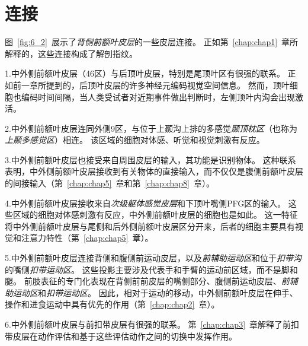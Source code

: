 \section{连接}

图~\ref{fig:6_2}~展示了\textit{背侧前额叶皮层}的一些皮层连接。
正如第~\ref{chap:chap1}~章所解释的，这些连接构成了解剖指纹。
\par


1.中外侧前额叶皮层（46区）与后顶叶皮层，特别是尾顶叶区有很强的联系\cite{petrides1984projections}。
正如前一章所提到的，后顶叶皮层的许多神经元编码视觉空间信息。
然而，顶叶细胞也编码时间间隔\cite{leon2003representation}，当人类受试者对近期事件做出判断时，左侧顶叶内沟会出现激活\cite{dudukovic2007goal}。
\par


2.中外侧前额叶皮层连同外侧9区，与位于上颞沟上排的多感觉\textit{颞顶枕区}（也称为\textit{上颞多感觉区}）相连\cite{seltzer1996overlapping}。
该区域的细胞对体感、听觉和视觉刺激有反应\cite{bruce1981visual}。
\par


3.中外侧前额叶皮层也接受来自周围皮层的输入\cite{petrides1999dorsolateral}，其功能是识别物体\cite{murray2007orbitofrontal}。
这种联系表明，中外侧前额叶皮层接收到有关物体的直接输入，而不仅仅是腹侧前额叶皮层的间接输入（第~\ref{chap:chap5}~章和第~\ref{chap:chap8}~章）。
\par


4.中外侧前额叶皮层接收来自\textit{次级躯体感觉皮层}\cite{petrides2002comparative}和下顶叶嘴侧PFG区\cite{rozzi2006cortical}的输入。
这些区域的细胞对体感刺激有反应\cite{hyva1981regional}，中外侧前额叶皮层的细胞也是如此\cite{tanila1993regional}。
这一特征将中外侧前额叶皮层与尾侧和后外侧前额叶皮层区分开来，后者的细胞主要具有视觉和注意力特性（第~\ref{chap:chap5}~章）。
\par


5.中外侧前额叶皮层连接背侧和腹侧前运动皮层\cite{wang2002spatial}，以及\textit{前辅助运动区}\cite{wang2005prefrontal}和位于\textit{扣带沟}的嘴侧\textit{扣带运动区}\cite{dum1993cingulate}。
这些投影主要涉及代表手和手臂的运动前区域，而不是脚和腿。
前肢表征的专门化表现在背侧前前皮层的嘴侧部分\cite{tachibana2004input}、腹侧前运动皮层\cite{he1993topographic}、\textit{前辅助运动区}\cite{luppino1991multiple}和\textit{扣带运动区}\cite{he1995topographic}。
因此，相对于运动的移动，中外侧前额叶皮层在伸手、操作和进食运动中具有优先的作用（第~\ref{chap:chap2}~章）。
\par


6.中外侧前额叶皮层与前扣带皮层有很强的联系\cite{petrides1999dorsolateral}。
第~\ref{chap:chap3}~章解释了前扣带皮层在动作评估和基于这些评估动作之间的切换中发挥作用\cite{walton2007adaptive}。
\par


